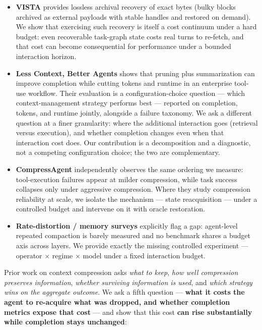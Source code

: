 \documentclass[11pt]{article}
\begin{document}
\begin{itemize}
\item \textbf{VISTA} provides lossless archival recovery of exact bytes (bulky blocks archived as
  external payloads with stable handles and restored on demand). We show that exercising such
  recovery is itself a cost continuum under a hard budget: even recoverable task-graph state costs
  real turns to re-fetch, and that cost can become consequential for performance under a bounded
  interaction horizon.

\item \textbf{Less Context, Better Agents} shows that pruning plus summarization can improve
  completion while cutting tokens and runtime in an enterprise tool-use workflow. Their
  evaluation is a configuration-choice question --- which context-management strategy
  performs best --- reported on completion, tokens, and runtime jointly, alongside a
  failure taxonomy. We ask a different question at a finer granularity: where the
  additional interaction goes (retrieval versus execution), and whether completion
  changes even when that interaction cost does. Our contribution is a decomposition and
  a diagnostic, not a competing configuration choice; the two are complementary.

\item \textbf{CompressAgent} independently observes the same ordering we measure: tool-execution
  failures appear at milder compression, while task success collapses only under
  aggressive compression. Where they study compression reliability at scale, we isolate
  the mechanism --- state reacquisition --- under a controlled budget and intervene on it
  with oracle restoration.

\item \textbf{Rate-distortion / memory surveys} explicitly flag a gap: agent-level repeated
  compaction is barely measured and no benchmark shares a budget axis across layers. We
  provide exactly the missing controlled experiment --- operator $\times$ regime $\times$ model under a
  fixed interaction budget.
\end{itemize}

Prior work on context compression asks \emph{what to keep}, \emph{how well compression preserves
information}, \emph{whether surviving information is used}, and \emph{which strategy wins on the
aggregate outcome}. We ask a fifth question --- \textbf{what it costs the agent to re-acquire
what was dropped, and whether completion metrics expose that cost} --- and show that this
cost \textbf{can rise substantially while completion stays unchanged}:
\end{document}
